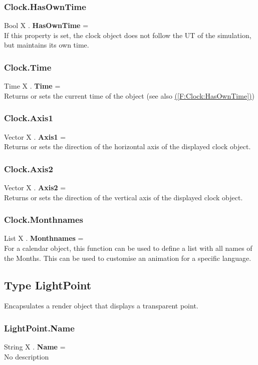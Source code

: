 \documentclass[10pt]{book}
\newcommand{\linkitem}[1]{\hyperref[#1]{\nameref{#1} (\ref{#1})}}
\begin{document}
\subsubsection{Clock.HasOwnTime \label{F:Clock:HasOwnTime}}
Bool X . \textbf{HasOwnTime} = \\
If this property is set, the clock object does not follow the UT of the simulation, but maintains its own time.

\subsubsection{Clock.Time \label{F:Clock:Time}}
Time X . \textbf{Time} = \\
Returns or sets the current time of the object (see also \linkitem{F:Clock:HasOwnTime})

\subsubsection{Clock.Axis1 \label{F:Clock:Axis1}}
Vector X . \textbf{Axis1} = \\
Returns or sets the direction of the horizontal axis of the displayed clock object.

\subsubsection{Clock.Axis2 \label{F:Clock:Axis2}}
Vector X . \textbf{Axis2} = \\
Returns or sets the direction of the vertical axis of the displayed clock object.

\subsubsection{Clock.Monthnames \label{F:Clock:Monthnames}}
List X . \textbf{Monthnames} = \\
For a calendar object, this function can be used to define a list with all names of the Months. This can be used to customise an animation for a specific language.

\subsection{Type LightPoint \label{T:LightPoint}}
Encapsulates a render object that displays a transparent point.

\subsubsection{LightPoint.Name \label{F:LightPoint:Name}}
String X . \textbf{Name} = \\
No description
\end{document}
